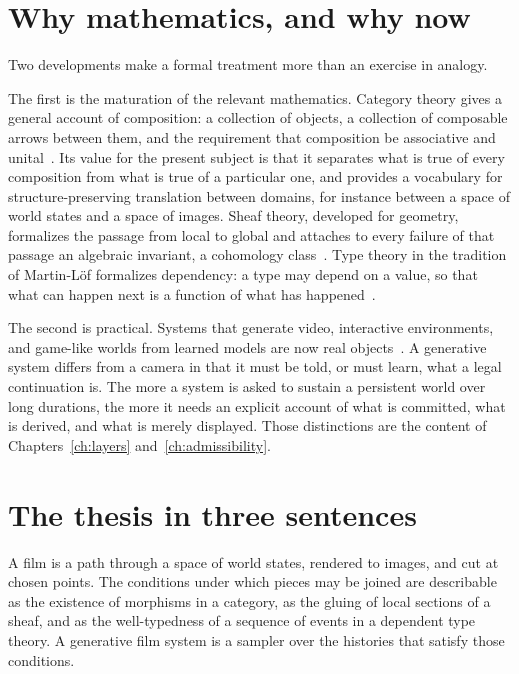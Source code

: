 \section{Why mathematics, and why now}

Two developments make a formal treatment more than an exercise in analogy.

The first is the maturation of the relevant mathematics. Category theory gives a general account of composition: a collection of objects, a collection of composable arrows between them, and the requirement that composition be associative and unital~\cite{maclane1998,awodey2010}. Its value for the present subject is that it separates what is true of every composition from what is true of a particular one, and provides a vocabulary for structure-preserving translation between domains, for instance between a space of world states and a space of images. Sheaf theory, developed for geometry, formalizes the passage from local to global and attaches to every failure of that passage an algebraic invariant, a cohomology class~\cite{maclane1992,bott1982}. Type theory in the tradition of Martin-L\"of formalizes dependency: a type may depend on a value, so that what can happen next is a function of what has happened~\cite{martinlof1984,hottbook2013}.

The second is practical. Systems that generate video, interactive environments, and game-like worlds from learned models are now real objects~\cite{ha2018worldmodels,bruce2024genie,valevski2024gamengen}. A generative system differs from a camera in that it must be told, or must learn, what a legal continuation is. The more a system is asked to sustain a persistent world over long durations, the more it needs an explicit account of what is committed, what is derived, and what is merely displayed. Those distinctions are the content of Chapters~\ref{ch:layers} and~\ref{ch:admissibility}.

\section{The thesis in three sentences}

A film is a path through a space of world states, rendered to images, and cut at chosen points. The conditions under which pieces may be joined are describable as the existence of morphisms in a category, as the gluing of local sections of a sheaf, and as the well-typedness of a sequence of events in a dependent type theory. A generative film system is a sampler over the histories that satisfy those conditions.

